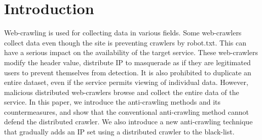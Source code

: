 \documentclass[sigconf,anonymous=false]{acmart}
\begin{document}
%
%
\section{Introduction}
Web-crawling is used for collecting data in various fields. Some web-crawlers collect data even though the site is preventing crawlers by robot.txt. This can have a serious impact on the availability of the target service. These web-crawlers modify the header value, distribute IP to masquerade as if they are legitimated users to prevent themselves from detection.
It is also prohibited to duplicate an entire dataset, even if the service permits viewing of individual data. However, malicious distributed web-crawlers browse and collect the entire data of the service.
In this paper, we introduce the anti-crawling methods and its countermeasures, and show that the conventional anti-crawling method cannot defend the distributed crawler. We also introduce a new anti-crawling technique that gradually adds an IP set using a distributed crawler to the black-list.

%
%
\end{document}
